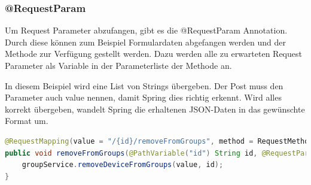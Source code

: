 \subsubsection{@RequestParam}
Um Request Parameter abzufangen, gibt es die @RequestParam Annotation. Durch diese können zum Beispiel Formulardaten abgefangen werden und der Methode zur Verfügung gestellt werden. Dazu werden alle zu erwarteten Request Parameter als Variable in der Parameterliste der Methode an.

In diesem Beispiel wird eine List von Strings übergeben. Der Post muss den Parameter auch value nennen, damit Spring dies richtig erkennt. Wird alles korrekt übergeben, wandelt Spring die erhaltenen JSON-Daten in das gewünschte Format um.
\begin{lstlisting}[language=java]
@RequestMapping(value = "/{id}/removeFromGroups", method = RequestMethod.POST)
public void removeFromGroups(@PathVariable("id") String id, @RequestParam("value") List<String> value) {
	groupService.removeDeviceFromGroups(value, id);
}
\end{lstlisting}
\newpage

